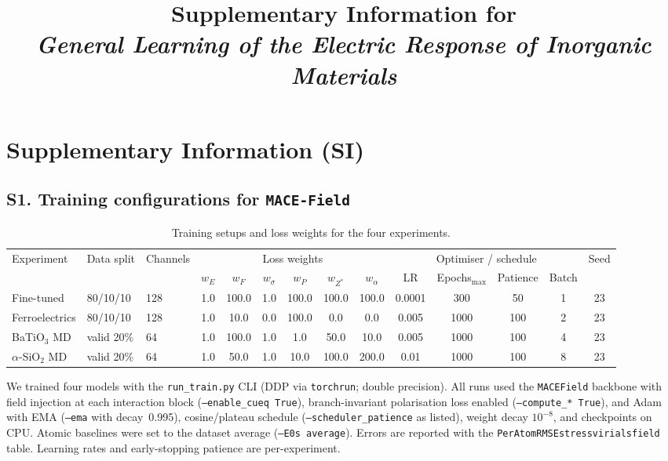\documentclass[aps,physrev,graphicx,amsmath,amssymb,reprint]{revtex4-2} %
\title{Supplementary Information for\\
\textit{General Learning of the Electric Response of Inorganic Materials}}
\begin{document}
\maketitle

\section*{Supplementary Information (SI)}

\subsection*{S1. Training configurations for \texttt{MACE-Field}}

\begin{table}[t]
  \centering
  \small
  \caption{Training setups and loss weights for the four experiments.}
  \label{tab:training_setups}
  \begin{tabular}{@{}l l l c c c c c c c c c c c@{}}
  \toprule
  Experiment & Data split & Channels &
  \multicolumn{6}{c}{Loss weights} & \multicolumn{4}{c}{Optimiser / schedule} & Seed \\
   & & & $w_E$ & $w_F$ & $w_\sigma$ & $w_P$ & $w_{Z^*}$ & $w_{\alpha}$ & LR & Epochs$_\text{max}$ & Patience & Batch &  \\
  \midrule
  Fine-tuned & 80/10/10 &
  128 & 1.0 & 100.0 & 1.0 & 100.0 & 100.0 & 100.0 & 0.0001 & 300 & 50 & 1 & 23 \\
  Ferroelectrics & 80/10/10 &
  128 & 1.0 & 10.0 & 0.0 & 100.0 & 0.0 & 0.0 & 0.005 & 1000 & 100 & 2 & 23 \\
  BaTiO$_3$ MD & valid 20\% &
  64 & 1.0 & 100.0 & 1.0 & 1.0 & 50.0 & 10.0 & 0.005 & 1000 & 100 & 4 & 23 \\
  $\alpha$-SiO$_2$ MD & valid 20\% &
  64 & 1.0 & 50.0 & 1.0 & 10.0 & 100.0 & 200.0 & 0.01 & 1000 & 100 & 8 & 23 \\
  \bottomrule
  \end{tabular}
\end{table}

We trained four models with the \texttt{run\_train.py} CLI (DDP via \texttt{torchrun}; double precision). All runs used the
\texttt{MACEField} backbone with field injection at each interaction block (\texttt{--enable\_cueq True}),
branch-invariant polarisation loss enabled (\texttt{--compute\_* True}), and Adam with EMA (\texttt{--ema} with
decay~0.995), cosine/plateau schedule (\texttt{--scheduler\_patience} as listed), weight decay $10^{-8}$, and checkpoints on CPU.
Atomic baselines were set to the dataset average (\texttt{--E0s average}). Errors are reported with the
\texttt{PerAtomRMSEstressvirialsfield} table. Learning rates and early-stopping patience are per-experiment.
\\
\end{document}
